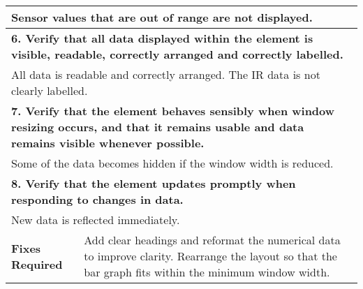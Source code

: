 \begin{longtable}{ l p{10cm} }
 \multicolumn{2}{p{14cm}}{Sensor values that are out of range are not displayed.}\\
 \hline
 \multicolumn{2}{p{14cm}}{\textbf{6. Verify that all data displayed within the element is visible, readable, correctly arranged and correctly labelled.}}\\
 \multicolumn{2}{p{14cm}}{All data is readable and correctly arranged. The IR data is not clearly labelled.}\\
 \hline
 \multicolumn{2}{p{14cm}}{\textbf{7. Verify that the element behaves sensibly when window resizing occurs, and that it remains usable and data remains visible whenever possible.}}\\
 \multicolumn{2}{p{14cm}}{Some of the data becomes hidden if the window width is reduced.}\\
 \hline
 \multicolumn{2}{p{14cm}}{\textbf{8. Verify that the element updates promptly when responding to changes in data.}}\\
 \multicolumn{2}{p{14cm}}{New data is reflected immediately.}\\
 \hline
 \textbf{Fixes Required} & Add clear headings and reformat the numerical data to improve clarity. Rearrange the layout so that the bar graph fits within the minimum window width.\\
 \bottomrule
\end{longtable}
\clearpage

